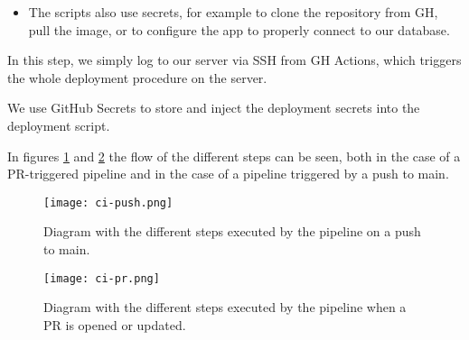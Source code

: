 \begin{enumerate}
\begin{itemize}
		\item The scripts also use secrets, for example to clone the repository from GH, pull the image, or to configure the app to properly connect to our database. %
	\end{itemize}
	In this step, we simply log to our server via SSH from GH Actions, which triggers the whole deployment procedure on the server. %
\end{enumerate}
We use GitHub Secrets to store and inject the deployment secrets into the deployment script.

In figures \ref{fig:ci-push} and \ref{fig:ci-pr} the flow of the different steps can be seen, both in the case of a PR-triggered pipeline and in the case of a pipeline triggered by a push to main.

\begin{figure}[H]
	\centering
	\texttt{[image: ci-push.png]}
	\caption{Diagram with the different steps executed by the pipeline on a push to main.}
	\label{fig:ci-push}
\end{figure}

\begin{figure}[H]
	\centering
	\texttt{[image: ci-pr.png]}
	\caption{Diagram with the different steps executed by the pipeline when a PR is opened or updated.}
	\label{fig:ci-pr}
\end{figure}

